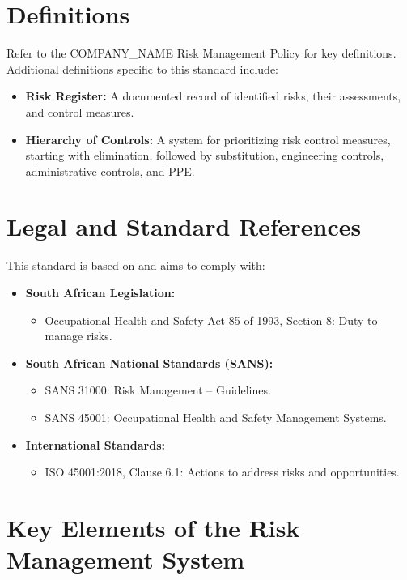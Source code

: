 \documentclass[12pt]{article}
\begin{document}
\section{Definitions}
Refer to the {{COMPANY_NAME}} Risk Management Policy for key definitions. Additional definitions specific to this standard include:
\begin{itemize}
    \item \textbf{Risk Register:} A documented record of identified risks, their assessments, and control measures.
    \item \textbf{Hierarchy of Controls:} A system for prioritizing risk control measures, starting with elimination, followed by substitution, engineering controls, administrative controls, and PPE.
\end{itemize}

\section{Legal and Standard References}
This standard is based on and aims to comply with:
\begin{itemize}
    \item \textbf{South African Legislation:}
    \begin{itemize}
        \item Occupational Health and Safety Act 85 of 1993, Section 8: Duty to manage risks.
    \end{itemize}
    \item \textbf{South African National Standards (SANS):}
    \begin{itemize}
        \item SANS 31000: Risk Management – Guidelines.
        \item SANS 45001: Occupational Health and Safety Management Systems.
    \end{itemize}
    \item \textbf{International Standards:}
    \begin{itemize}
        \item ISO 45001:2018, Clause 6.1: Actions to address risks and opportunities.
    \end{itemize}
\end{itemize}

\section{Key Elements of the Risk Management System}
\end{document}

